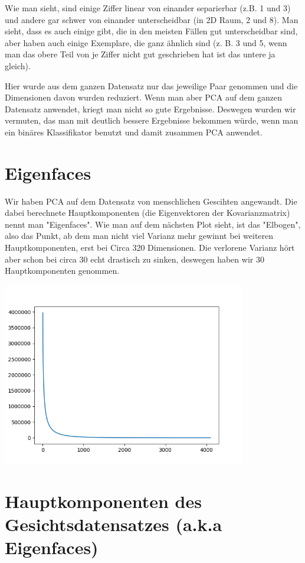 Wie man sieht, sind einige Ziffer linear von einander separierbar (z.B. 1 und 3) und andere
gar schwer von einander unterscheidbar (in 2D Raum, 2 und 8). Man sieht, dass es auch einige gibt, die in den meisten
Fällen gut unterscheidbar sind, aber haben auch einige Exemplare, die ganz ähnlich sind (z. B. 3 und 5, wenn man das
obere Teil von je Ziffer nicht gut geschrieben hat ist das untere ja gleich).


Hier wurde aus dem ganzen Datensatz nur das jeweilige Paar genommen und die Dimensionen davon wurden reduziert.
Wenn man aber PCA auf dem ganzen Datensatz anwendet, kriegt man nicht so gute Ergebnisse. Deswegen wurden wir vermuten,
das man mit deutlich bessere Ergebnisse bekommen würde, wenn man ein binäres Klassifikator benutzt und damit zusammen
PCA anwendet.

\section*{Eigenfaces}

Wir haben PCA auf dem Datensatz von menschlichen Gescihten angewandt. Die dabei berechnete Hauptkomponenten
(die Eigenvektoren der Kovarianzmatrix) nennt man "Eigenfaces". Wie man auf dem nächsten Plot sieht, ist
das "Elbogen", also das Punkt, ab dem man nicht viel Varianz mehr gewinnt bei weiteren Hauptkomponenten, erst
bei Circa 320 Dimensionen. Die verlorene Varianz hört aber schon bei circa 30 echt drastisch zu sinken, deswegen
haben wir 30 Hauptkomponenten genommen.

\includegraphics[height=8cm]{./eigenfaces_variance_for_k.png}

\section*{Hauptkomponenten des Gesichtsdatensatzes (a.k.a Eigenfaces)}

